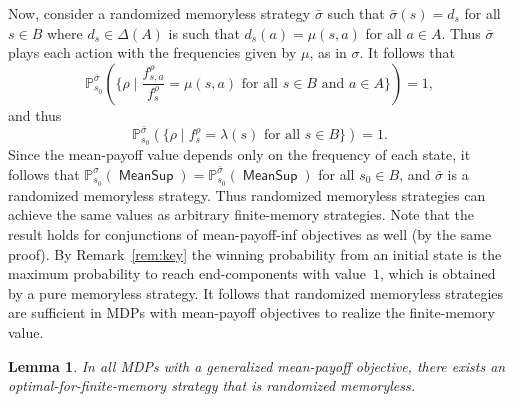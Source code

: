 \documentclass{article}
\newtheorem{lemma}{Lemma}
\newcommand{\DD}{\Delta}
\newcommand{\straa}{\sigma}
\newcommand{\prob}[1]{\mathbb{P}_{#1}}
\newcommand{\MeanSup}{\operatorname{\mathsf{MeanSup}}}
\begin{document}
\smallskip{}
Now, consider a randomized memoryless strategy $\bar{\straa}$ such that
$\bar{\straa}(s) = d_s$ for all $s \in B$ where $d_s \in \DD(A)$ is such that 
$d_s(a) = \mu(s,a)$ for all $a \in A$. Thus $\bar{\straa}$ plays each action 
with the frequencies given by $\mu$, as in $\straa$. 
It follows that 
$$
\prob{s_0}^{\bar{\straa}}(\{\rho \mid \frac{f_{s,a}^\rho}{f_s^\rho} = \mu(s,a) \text{ for all } s \in B \text{ and } a \in A \}) = 1,
$$
and thus
$$
\prob{s_0}^{\bar{\straa}}(\{\rho \mid f_s^\rho = \lambda(s) \text{ for all } s \in B \}) = 1.
$$
Since the mean-payoff value depends only on the frequency of each state,
it follows that $\prob{s_0}^{\straa}(\MeanSup) = \prob{s_0}^{\bar{\straa}}(\MeanSup)$
for all $s_0 \in B$, and $\bar{\straa}$ is a randomized memoryless strategy.
Thus randomized memoryless strategies can achieve the same values as arbitrary
finite-memory strategies.
Note that the result holds for conjunctions of mean-payoff-inf objectives 
as well (by the same proof).
By Remark~\ref{rem:key}
the winning probability from an initial state is the maximum probability to
reach end-components with value~$1$, which is obtained by a pure memoryless strategy.
It follows that randomized memoryless strategies are sufficient in MDPs
with mean-payoff objectives to realize the finite-memory value.




\begin{lemma} \label{lem:randomized-memoryless}
In all MDPs with a generalized mean-payoff objective, there exists 
an optimal-for-finite-memory strategy that is randomized memoryless.
\end{lemma}
\end{document}
